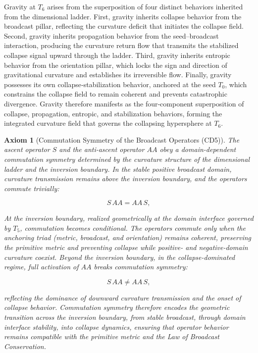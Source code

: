 \documentclass[final,onefignum,onetabnum]{siamart}
\newtheorem{axiom}{Axiom}
\begin{document}
\begin{corollary}
Gravity at $T_6$ arises from the superposition of four distinct behaviors inherited from the dimensional ladder. First, gravity inherits collapse behavior from the broadcast pillar, reflecting the curvature deficit that initiates the collapse field. Second, gravity inherits propagation behavior from the seed–broadcast interaction, producing the curvature return flow that transmits the stabilized collapse signal upward through the ladder. Third, gravity inherits entropic behavior from the orientation pillar, which locks the sign and direction of gravitational curvature and establishes its irreversible flow. Finally, gravity possesses its own collapse‑stabilization behavior, anchored at the seed $T_0$, which constrains the collapse field to remain coherent and prevents catastrophic divergence. Gravity therefore manifests as the four‑component superposition of collapse, propagation, entropic, and stabilization behaviors, forming the integrated curvature field that governs the collapsing hypersphere at $T_6$.
\end{corollary}

\begin{axiom}[Commutation Symmetry of the Broadcast Operators (CD5)]
The ascent operator $S$ and the anti-ascent operator $AA$ obey a domain-dependent commutation symmetry determined by the curvature structure of the dimensional ladder and the inversion boundary. In the stable positive broadcast domain, curvature transmission remains above the inversion boundary, and the operators commute trivially:


\[
S\,AA = AA\,S,
\]


At the inversion boundary, realized geometrically at the domain interface governed by $T_5$, commutation becomes conditional. The operators commute only when the anchoring triad (metric, broadcast, and orientation) remains coherent, preserving the primitive metric and preventing collapse while positive- and negative-domain curvature coexist. Beyond the inversion boundary, in the collapse-dominated regime, full activation of $AA$ breaks commutation symmetry:


\[
S\,AA \neq AA\,S,
\]


reflecting the dominance of downward curvature transmission and the onset of collapse behavior. Commutation symmetry therefore encodes the geometric transition across the inversion boundary, from stable broadcast, through domain interface stability, into collapse dynamics, ensuring that operator behavior remains compatible with the primitive metric and the Law of Broadcast Conservation.
\end{axiom}
\end{document}
